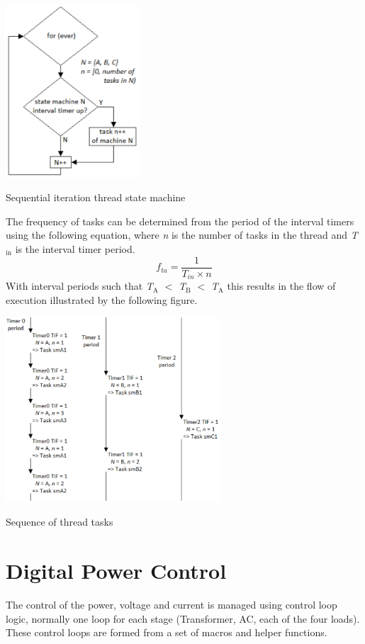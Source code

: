 \begin{DoxyImage}
\includegraphics[width=5cm]{state_machine_loop}
\caption{Sequential iteration thread state machine}
\end{DoxyImage}


The frequency of tasks can be determined from the period of the interval timers using the following equation, where {\itshape n} is the number of tasks in the thread and {\itshape T$_{\mbox{in}}$ } is the interval timer period. \[ f_{ta}= \frac{1}{T_{in} \times n} \] With interval periods such that {\itshape T$_{\mbox{A}}$ } {\ttfamily $<$} {\itshape T$_{\mbox{B}}$ } {\ttfamily $<$} {\itshape T$_{\mbox{A}}$ } this results in the flow of execution illustrated by the following figure.


\begin{DoxyImage}
\includegraphics[width=8cm]{seq_state_machine_task_itr}
\caption{Sequence of thread tasks}
\end{DoxyImage}
\hypertarget{index_dpctrl}{}\section{Digital Power Control}\label{index_dpctrl}
The control of the power, voltage and current is managed using control loop logic, normally one loop for each stage (Transformer, A\-C, each of the four loads). These control loops are formed from a set of macros and helper functions.


